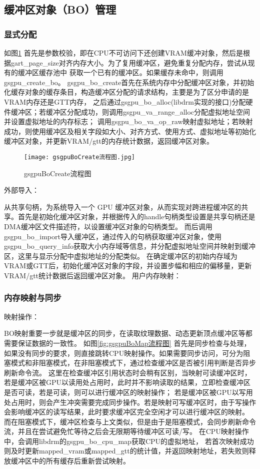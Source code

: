 \subsection{缓冲区对象（BO）管理}

\subsubsection{显式分配}

如图\ref{fig:gsgpuBoCreate流程图}
首先是参数校验，即在CPU不可访问下还创建VRAM缓冲对象，然后是根据gart\_page\_size对齐内存大小。为了复用缓冲区，避免重复分配内存，尝试从现有的缓冲区缓存池中
获取一个已有的缓冲区。如果缓存未命中，则调用gsgpu\_create\_bo。
gsgpu\_bo\_create首先在系统内存中分配缓冲区对象，并初始化缓存对象的缓存条目，构造缓冲区分配的请求结构，主要是为了区分申请的是VRAM内存还是GTT内存，
之后通过gsgpu\_bo\_alloc(libdrm实现的接口)分配硬件缓冲区；若缓冲区分配成功，则调用gsgpu\_va\_range\_alloc分配虚拟地址空间并设置虚拟地址的内存标志；
调用gsgpu\_bo\_va\_op\_raw映射虚拟地址；若映射成功，则使用缓冲区及相关字段如大小、对齐方式、使用方式、虚拟地址等初始化缓冲区对象，并更新VRAM/gtt的内存统计数据，返回缓冲区对象。
\begin{figure}[h]
  \centering
  \texttt{[image: gsgpuBoCreate流程图.jpg]}
  \caption{gsgpuBoCreate流程图}
  \label{fig:gsgpuBoCreate流程图}
\end{figure}

外部导入：

从共享句柄，为系统导入一个 GPU 缓冲区对象，从而实现对跨进程缓冲区的共享。首先是初始化缓冲区对象，并根据传入的handle句柄类型设置是共享句柄还是DMA缓冲区文件描述符，以设置缓冲区对象的句柄类型。
而后调用gsgpu\_bo\_import导入缓冲区，通过传入的句柄获取缓冲区对象，使用gsgpu\_bo\_query\_info获取大小内存域等信息，并分配虚拟地址空间并映射到缓冲区，这里与显示分配中虚拟地址的分配类似。
在确定缓冲区的初始内存域为VRAM或GTT后，初始化缓冲区对象的字段，并设置步幅和相应的偏移量，更新VRAM/gtt统计数据后返回缓冲区对象。
用户内存映射：

\subsubsection{内存映射与同步}

映射操作：

BO映射重要一步就是缓冲区的同步，在读取纹理数据、动态更新顶点缓冲区等都需要保证数据的一致性。
如图\ref{fig:gsgpuBoMap流程图}
首先是同步检查与处理，如果没有同步的要求，则直接跳转CPU映射操作。如果需要同步访问，可分为阻塞模式和非阻塞模式，在非阻塞模式下，通过检查缓冲区是否被引用判断是否异步刷新命令流。
这里在检查缓冲区引用状态时会稍有区别，当映射可读缓冲区时，若是缓冲区被GPU以读用处占用时，此时并不影响读取的结果，立即检查缓冲区是否可读，若是可读，则可以进行缓冲区的映射操作；
若是缓冲区被GPU以写用处占用时，则会产生冲突需要完成同步操作。若是映射可写缓冲区时，由于写操作会影响缓冲区的读写结果，此时要求缓冲区完全空闲才可以进行缓冲区的映射。
而在阻塞模式下，缓冲区检查与上文类似，但是由于是阻塞模式，会同步刷新命令流，并且在尝试避免忙等待之后会无限期等待缓冲区可读/写。
在CPU映射操作中，会调用libdrm的gsgpu\_bo\_cpu\_map获取CPU的虚拟地址，
若首次映射成功则及时更新mapped\_vram或mapped\_gtt的统计值，并返回映射地址，若失败则释放缓冲区中的所有缓存后重新尝试映射。

